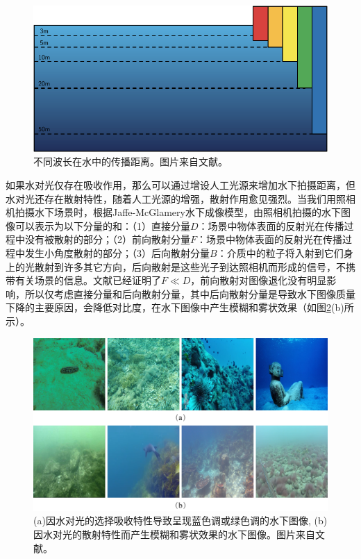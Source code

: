 \begin{figure}[ht]
    \centering
	\includegraphics[width=\textwidth]{figs/wavelength.pdf}
	\caption{不同波长在水中的传播距离。图片来自文献\cite{han2018review}。}
	\label{wavelength}
\end{figure}

如果水对光仅存在吸收作用，那么可以通过增设人工光源来增加水下拍摄距离，但水对光还存在散射特性，随着人工光源的增强，散射作用愈见强烈。当我们用照相机拍摄水下场景时，根据Jaffe-McGlamery水下成像模型\cite{jaffe1990computer}\cite{mcglamery1980computer}，由照相机拍摄的水下图像可以表示为以下分量的和：（1）直接分量$D$：场景中物体表面的反射光在传播过程中没有被散射的部分；（2）前向散射分量$F$：场景中物体表面的反射光在传播过程中发生小角度散射的部分；（3）后向散射分量$B$：介质中的粒子将入射到它们身上的光散射到许多其它方向，后向散射是这些光子到达照相机而形成的信号，不携带有关场景的信息。文献\cite{schechner2004clear}已经证明了$F\ll D$，前向散射对图像退化没有明显影响，所以仅考虑直接分量和后向散射分量，其中后向散射分量是导致水下图像质量下降的主要原因，会降低对比度，在水下图像中产生模糊和雾状效果（如图\ref{color}(b)所示）。

\begin{figure}[htp]
    \centering
	\includegraphics[width=\textwidth]{figs/color.pdf}
	\caption{(a)因水对光的选择吸收特性导致呈现蓝色调或绿色调的水下图像, (b)因水对光的散射特性而产生模糊和雾状效果的水下图像。图片来自文献\cite{fabbri2018enhancing}\cite{islam2019fast}。}
	\label{color}
\end{figure}

